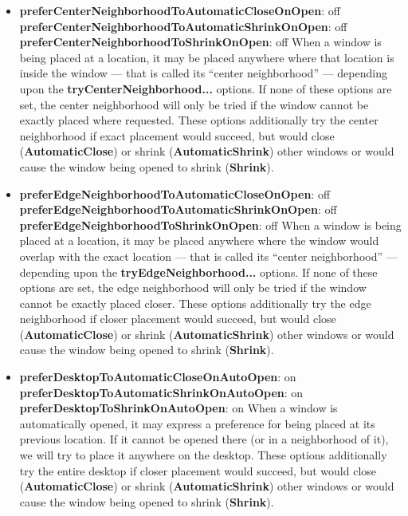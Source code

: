 \begin{itemize}
\item {\bf preferCenterNeighborhoodToAutomaticCloseOnOpen}: off\newline{}
{\bf preferCenterNeighborhoodToAutomaticShrinkOnOpen}: off\newline{}
{\bf preferCenterNeighborhoodToShrinkOnOpen}: off\newline{}
When a window is being placed at a location, it may be placed
anywhere where that location is inside the window --- that is
called its ``center neighborhood'' --- depending upon the
{\bf tryCenterNeighborhood...} options.  If none of these options
are set, the center neighborhood will only be tried if the window
cannot be exactly placed where requested.  These options
additionally try the center neighborhood if exact placement would
succeed, but would close ({\bf AutomaticClose}) or shrink
({\bf AutomaticShrink}) other windows or
would cause the window being opened to shrink ({\bf Shrink}).

\item {\bf preferEdgeNeighborhoodToAutomaticCloseOnOpen}: off\newline{}
{\bf preferEdgeNeighborhoodToAutomaticShrinkOnOpen}: off\newline{}
{\bf preferEdgeNeighborhoodToShrinkOnOpen}: off\newline{}
When a window is being placed at a location, it may be placed
anywhere where the window would overlap with the exact location
--- that is called its ``center neighborhood'' --- depending upon the
{\bf tryEdgeNeighborhood...} options.  If none of these options are
set, the edge neighborhood will only be tried if the window
cannot be exactly placed closer.  These options additionally try
the edge neighborhood if closer placement would succeed, but
would close ({\bf AutomaticClose}) or shrink
({\bf AutomaticShrink}) other windows or
would cause the window being opened to shrink ({\bf Shrink}).

\item {\bf preferDesktopToAutomaticCloseOnAutoOpen}: on\newline{}
{\bf preferDesktopToAutomaticShrinkOnAutoOpen}: on\newline{}
{\bf preferDesktopToShrinkOnAutoOpen}: on\newline{}
When a window is automatically opened, it may express a
preference for being placed at its previous location.  If it
cannot be opened there (or in a neighborhood of it), we
will try to place it anywhere on the desktop.  These options
additionally try the entire desktop if closer placement would
succeed, but would close ({\bf AutomaticClose}) or shrink
({\bf AutomaticShrink}) other windows or
would cause the window being opened to shrink ({\bf Shrink}).


\end{itemize}
